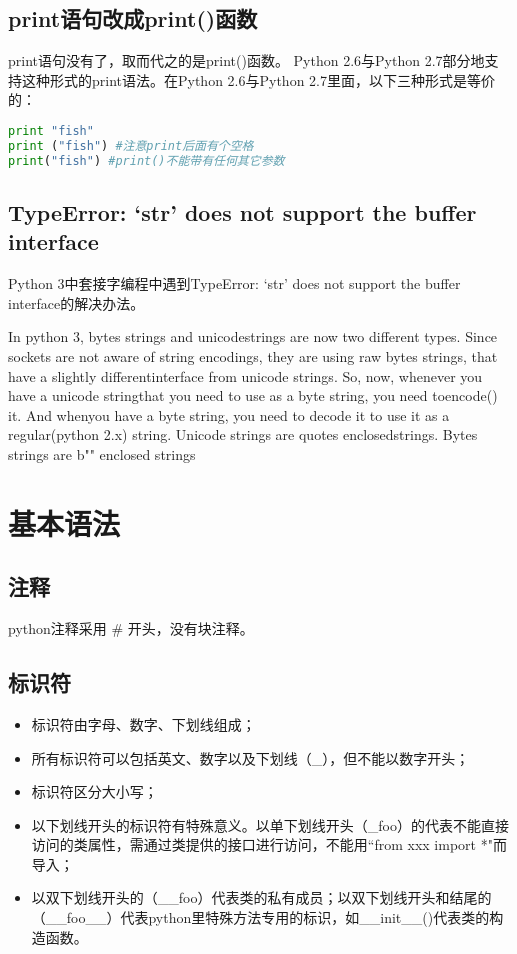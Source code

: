 \subsection{print语句改成print()函数}
print语句没有了，取而代之的是print()函数。 Python 2.6与Python 2.7部分地支持这种形式的print语法。在Python 2.6与Python 2.7里面，以下三种形式是等价的：
\begin{lstlisting}[language=Python]
print "fish"
print ("fish") #注意print后面有个空格
print("fish") #print()不能带有任何其它参数
\end{lstlisting}



\subsection{TypeError: `str' does not support the buffer interface}
 Python 3中套接字编程中遇到TypeError: `str' does not support the buffer interface的解决办法。

In python 3, bytes strings and unicodestrings are now two different types. Since sockets are not aware of string encodings, they are using raw bytes strings, that have a slightly differentinterface from unicode strings.
So, now, whenever you have a unicode stringthat you need to use as a byte string, you need toencode() it. And whenyou have a byte string, you need to decode it to use it as a regular(python 2.x) string.
Unicode strings are quotes enclosedstrings. Bytes strings are b"" enclosed strings




\section{基本语法}
\subsection{注释}
python注释采用 \# 开头，没有块注释。



\subsection{标识符}
\begin{itemize}
\item 标识符由字母、数字、下划线组成；

\item 所有标识符可以包括英文、数字以及下划线（\_），但不能以数字开头；

\item 标识符区分大小写；

\item 以下划线开头的标识符有特殊意义。以单下划线开头（\_foo）的代表不能直接访问的类属性，需通过类提供的接口进行访问，不能用``from xxx import *"而导入；

\item 以双下划线开头的（\_\_foo）代表类的私有成员；以双下划线开头和结尾的（\_\_foo\_\_）代表python里特殊方法专用的标识，如\_\_init\_\_()代表类的构造函数。
\end{itemize}



